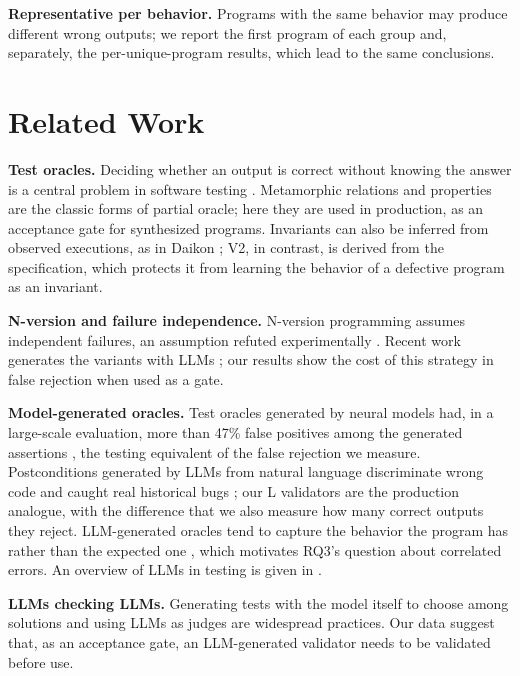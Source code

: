 \documentclass[sigconf,nonacm]{acmart}
\begin{document}
\textbf{Representative per behavior.} Programs with the same behavior may produce different wrong outputs; we report the first program of each group and, separately, the per-unique-program results, which lead to the same conclusions.

\section{Related Work}

\textbf{Test oracles.} Deciding whether an output is correct without knowing the answer is a central problem in software testing \cite{barr2015oracle}. Metamorphic relations \cite{chen1998metamorphic,segura2016survey} and properties \cite{claessen2000quickcheck} are the classic forms of partial oracle; here they are used in production, as an acceptance gate for synthesized programs. Invariants can also be inferred from observed executions, as in Daikon \cite{ernst2007daikon}; V2, in contrast, is derived from the specification, which protects it from learning the behavior of a defective program as an invariant.

\textbf{N-version and failure independence.} N-version programming \cite{avizienis1985nversion} assumes independent failures, an assumption refuted experimentally \cite{knight1986experimental}. Recent work generates the variants with LLMs \cite{ron2024galapagos}; our results show the cost of this strategy in false rejection when used as a gate.

\textbf{Model-generated oracles.} Test oracles generated by neural models \cite{dinella2022toga} had, in a large-scale evaluation, more than 47\% false positives among the generated assertions \cite{hossain2023neural}, the testing equivalent of the false rejection we measure. Postconditions generated by LLMs from natural language discriminate wrong code and caught real historical bugs \cite{endres2024nl2postcond}; our L validators are the production analogue, with the difference that we also measure how many correct outputs they reject. LLM-generated oracles tend to capture the behavior the program has rather than the expected one \cite{konstantinou2024oracles}, which motivates RQ3's question about correlated errors. An overview of LLMs in testing is given in \cite{wang2024survey}.

\textbf{LLMs checking LLMs.} Generating tests with the model itself to choose among solutions \cite{chen2022codet} and using LLMs as judges \cite{zheng2023judging} are widespread practices. Our data suggest that, as an acceptance gate, an LLM-generated validator needs to be validated before use.
\end{document}
